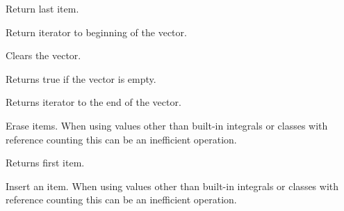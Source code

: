 Return last item.

\label{wxvectorbegin}



Return iterator to beginning of the vector.

\label{wxvectorcapacity}



\label{wxvectorclear}


Clears the vector.

\label{wxvectorempty}


Returns true if the vector is empty.

\label{wxvectorend}



Returns iterator to the end of the vector.

\label{wxvectorerase}



Erase items. When using values other than built-in integrals 
or classes with reference counting this can be an inefficient
operation.

\label{wxvectorfront}



Returns first item.

\label{wxvectorinsert}


Insert an item. When using values other than built-in integrals 
or classes with reference counting this can be an inefficient
operation.

\label{wxvectoroperatorunknown}

